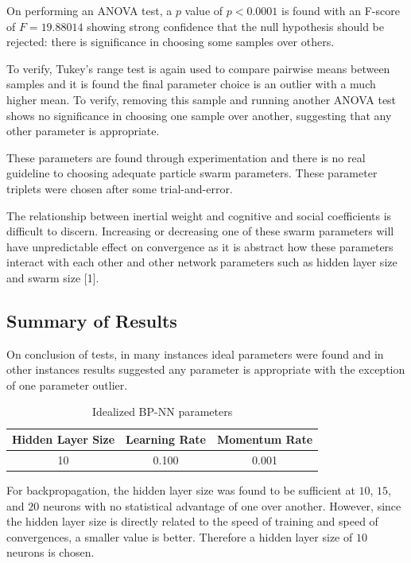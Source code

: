 \documentclass[a4paper,12pt]{article}
\begin{document}
On performing an ANOVA test, a $p$ value of $p < 0.0001$ is found with an F-score of $F = 19.88014$ showing strong confidence that the null hypothesis should be rejected: there is significance in choosing some samples over others.

To verify, Tukey's range test is again used to compare pairwise means between samples and it is found the final parameter choice is an outlier with a much higher mean. To verify, removing this sample and running another ANOVA test shows no significance in choosing one sample over another, suggesting that any other parameter is appropriate.

These parameters are found through experimentation and there is no real guideline to choosing adequate particle swarm parameters. These parameter triplets were chosen after some trial-and-error.

The relationship between inertial weight and cognitive and social coefficients is difficult to discern. Increasing or decreasing one of these swarm parameters will have unpredictable effect on convergence as it is abstract how these parameters interact with each other and other network parameters such as hidden layer size and swarm size [1].

\subsection{Summary of Results}

On conclusion of tests, in many instances ideal parameters were found and in other instances results suggested any parameter is appropriate with the exception of one parameter outlier.

\begin{table}[h!]
\centering
\begin{tabular}{|c|c|c|}
\hline
\textbf{Hidden Layer Size} & \textbf{Learning Rate} & \textbf{Momentum Rate} \\ \hline
10 & 0.100 & 0.001 \\ \hline
\end{tabular}
\caption{Idealized BP-NN parameters}
\label{Tab:bp-nn-ideal}
\end{table}

\pagebreak

For backpropagation, the hidden layer size was found to be sufficient at $10$, $15$, and $20$ neurons with no statistical advantage of one over another. However, since the hidden layer size is directly related to the speed of training and speed of convergences, a smaller value is better. Therefore a hidden layer size of $10$ neurons is chosen.
\end{document}
